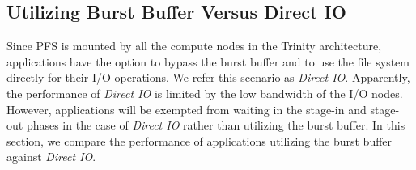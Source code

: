 %
%
%
\subsection{Utilizing Burst Buffer Versus Direct IO}
\label{Sec:Sim:DirectIOvsBB}



Since PFS is mounted by all the compute nodes in the Trinity architecture, applications have the
option to bypass the burst buffer and to use the file system directly for their I/O operations.
We refer this scenario as \textit{Direct IO}. Apparently, the performance of \textit{Direct IO}
is limited by the low bandwidth of the I/O nodes. However, applications will be exempted from
waiting in the stage-in and stage-out phases in the case of \textit{Direct IO} rather than utilizing the burst buffer.
In this section, we compare the performance of applications utilizing the burst buffer
against \textit{Direct IO}.


